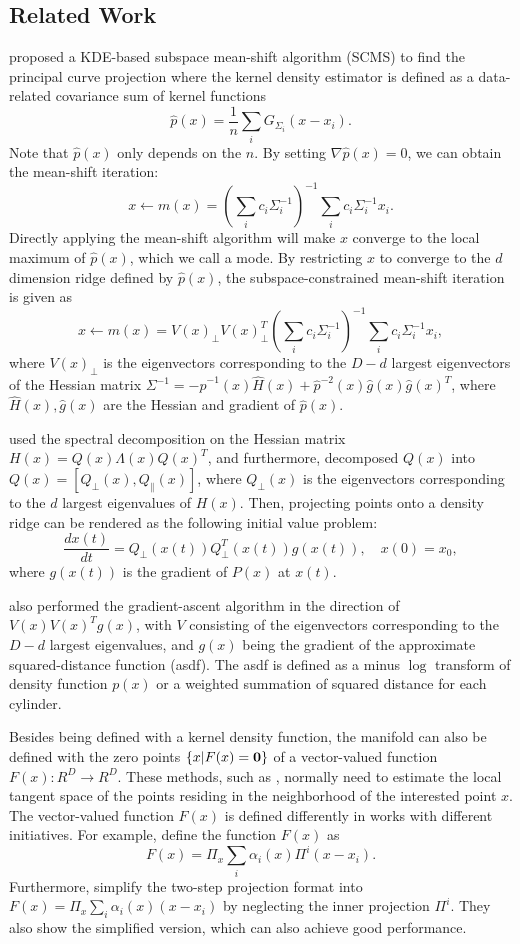 \documentclass[aos,preprint]{imsart}
\theoremstyle{remark}
\begin{document}
\subsection{Related Work}
\cite{ozertem2011locally} proposed a KDE-based subspace mean-shift algorithm (SCMS) to find the principal curve projection where the kernel density estimator is defined as a data-related covariance sum of kernel functions 
\[
\hat{p}(x) = \frac{1}{n}\sum_i G_{\Sigma_i}(x -x_i).
\] 
{Note that $\hat{p}(x)$ only depends on the $n$.} By setting $\nabla \hat{p}(x) = 0$, we can obtain the mean-shift iteration: 
\[
x\leftarrow m(x) = (\sum_i c_i \Sigma_i^{-1} )^{-1} \sum_i c_i \Sigma_i^{-1}x_i.
\]
Directly applying the mean-shift algorithm will make $x$ converge to the local maximum of $\hat{p}(x)$, which we call a mode. By restricting $x$ to converge to the $d$ dimension ridge defined by $\hat{p}(x)$, the subspace-constrained mean-shift iteration \cite{ozertem2011locally} is given as
\[
x\leftarrow m(x) =V(x)_{\perp} V(x)_{\perp}^T (\sum_i c_i \Sigma_i^{-1} )^{-1} \sum_i c_i \Sigma_i^{-1}x_i,
\]
where $V(x)_{\perp}$ is the eigenvectors corresponding to the $D-d$ largest eigenvectors of the Hessian matrix $\Sigma^{-1} = -\hat{p}^{-1}(x)\hat{H}(x)+\hat{p}^{-2}(x)\hat{g}(x)\hat{g}(x)^T$, where $\hat{H}(x), \hat{g}(x)$ are the Hessian and gradient of $\hat{p}(x)$.

\cite{myhre2016manifold} used the spectral decomposition on the Hessian matrix $H(x) = Q(x)\Lambda(x)Q(x)^T$, and furthermore, decomposed $Q(x)$ into $Q(x)=[Q_\perp(x), Q_{\|}(x)]$, where $Q_\perp(x)$ is the eigenvectors corresponding to the $d$ largest eigenvalues of $H(x)$. Then, projecting points onto a density ridge can be rendered as the following initial value problem:
\[
\frac{d x(t)}{dt} = Q_{\perp}(x(t)) Q^T_{\perp}(x(t)) g(x(t)), \quad x(0) = x_0,
\]
where $g(x(t))$ is the gradient of $P(x)$ at $x(t)$.

\cite{mohammed2017manifold} also performed the gradient-ascent algorithm in the direction of $V(x)V(x)^Tg(x)$, with $V$ consisting of the eigenvectors corresponding to the $D-d$ largest eigenvalues, and $g(x)$ being the gradient of the approximate squared-distance function (asdf). The asdf is defined as a minus $\log$ transform of density function $p(x)$ or a weighted summation of squared distance for each cylinder.

Besides being defined with a kernel density function, the manifold can also be defined with the zero points $\{x| F(x)={\bf 0}\}$ of a vector-valued function $F(x): R^D \rightarrow R^D$. These methods, such as \cite{fefferman2018fitting, mohammed2017manifold, yao2019manifold}, normally need to estimate the local tangent space of the points residing in the neighborhood of the interested point $x$. The vector-valued function $F(x)$ is defined differently in works with different initiatives. For example,  \cite{fefferman2018fitting} define the function $F(x)$ as
\[
F(x)= \Pi_x \sum_i \alpha_i(x) \Pi^i(x - x_i).
\]
Furthermore, \cite{yao2019manifold} simplify the two-step projection format into $F(x)= \Pi_x \sum_i \alpha_i(x) (x - x_i)$ by neglecting the inner projection $\Pi^i$. They also show the simplified version, which can also achieve good performance.
\end{document}
